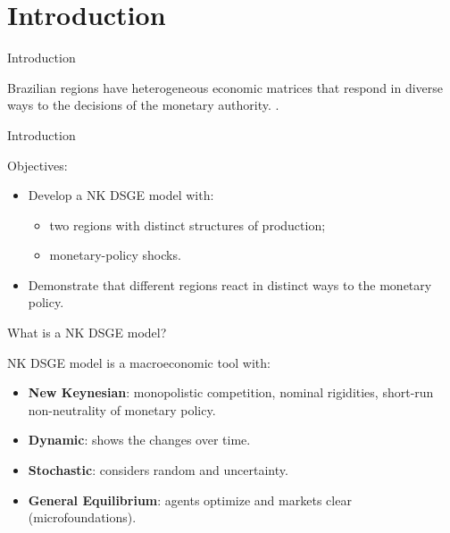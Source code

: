 \documentclass[../quali_slides.tex]{subfiles}
\begin{document}
	
\section{Introduction}


\begin{frame}{Introduction}
	
	Brazilian regions have heterogeneous economic matrices that respond in diverse ways to the decisions of the monetary authority. \cite{bertanha_efeitos_2008}.		
	
\end{frame}


\begin{frame}{Introduction}

	Objectives:
	
	\begin{itemize}
		
		\item Develop a NK DSGE model with:
			
			\begin{itemize}
				\item two regions with distinct structures of production;
				\item monetary-policy shocks.
			\end{itemize}
		
		\item Demonstrate that different regions react in distinct ways to the monetary policy.
		
	\end{itemize}

\end{frame}


\begin{frame}{What is a NK DSGE model?}
	
	NK DSGE model is a macroeconomic tool with:
	
	\begin{itemize}
		
		\item \textbf{New Keynesian}: monopolistic competition, nominal rigidities, short-run non-neutrality of monetary policy.
		
		\item \textbf{Dynamic}: shows the changes over time.
		
		\item \textbf{Stochastic}: considers random and uncertainty.
		
		\item \textbf{General Equilibrium}: agents optimize and markets clear (microfoundations).
		
	\end{itemize}
	
\end{frame}
\end{document}

